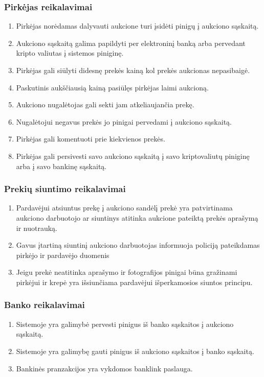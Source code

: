 \documentclass{VUMIFPSmagistrinis}
\begin{document}
				\subsubsection{Pirkėjas reikalavimai}
					\begin{enumerate}
						\item{Pirkėjas norėdamas dalyvauti aukcione turi įsidėti pinigų į aukciono sąskaitą.}
						\item{Aukciono sąskaitą galima papildyti per elektroninį banką arba pervedant kripto valiutas į sistemos piniginę.}
						\item{Pirkėjas gali siūlyti didesnę prekės kainą kol prekės aukcionas nepasibaigė.}
						\item{Paskutinis aukščiausią kainą pasiūlęs pirkėjas laimi aukcioną.}
						\item{Aukciono nugalėtojas gali sekti jam atkeliaujančia prekę.}
						\item{Nugalėtojui negavus prekės jo pinigai pervedami į aukciono sąskaitą.}
						\item{Pirkėjas gali komentuoti prie kiekvienos prekės.}
						\item{Pirkėjas gali persivesti savo aukciono sąskaitą į savo kriptovaliutų piniginę arba į savo bankinę sąskaitą.}
					\end{enumerate}
				\subsubsection{Prekių siuntimo reikalavimai}
					\begin{enumerate}
						\item{Pardavėjui atsiuntus prekę į aukciono sandėlį prekė yra patvirtinama aukciono darbuotojo ar siuntinys atitinka aukcione pateiktą prekės aprašymą ir nuotrauką.}
						\item{Gavus įtartiną siuntinį aukciono darbuotojas informuoja policiją pateikdamas pirkėjo ir pardavėjo duomenis}
						\item{Jeigu prekė neatitinka aprašymo ir fotografijos pinigai būna gražinami pirkėjui ir krepė yra išsiunčiama pardavėjui išperkamosios siuntos principu.}
					\end{enumerate}
				\subsubsection{Banko reikalavimai}
					\begin{enumerate}
						\item{Sistemoje yra galimybė pervesti pinigus iš banko sąskaitos į aukciono sąskaitą.}
						\item{Sistemoje yra galimybę gauti pinigus iš aukciono sąskaitos į banko sąskaitą.}
						\item{Bankinės pranzakcijos yra vykdomos banklink paslauga.}
					\end{enumerate}
\end{document}
